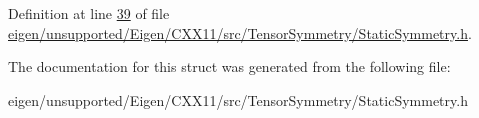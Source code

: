 Definition at line \hyperlink{eigen_2unsupported_2_eigen_2_c_x_x11_2src_2_tensor_symmetry_2_static_symmetry_8h_source_l00039}{39} of file \hyperlink{eigen_2unsupported_2_eigen_2_c_x_x11_2src_2_tensor_symmetry_2_static_symmetry_8h_source}{eigen/unsupported/\+Eigen/\+C\+X\+X11/src/\+Tensor\+Symmetry/\+Static\+Symmetry.\+h}.



The documentation for this struct was generated from the following file\+:\begin{DoxyCompactItemize}
\item 
eigen/unsupported/\+Eigen/\+C\+X\+X11/src/\+Tensor\+Symmetry/\+Static\+Symmetry.\+h\end{DoxyCompactItemize}
